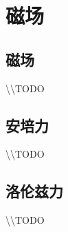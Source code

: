 
\section{磁场}

\subsection{磁场}

\textbackslash\textbackslash TODO

\subsection{安培力}

\textbackslash\textbackslash TODO

\subsection{洛伦兹力}

\textbackslash\textbackslash TODO
